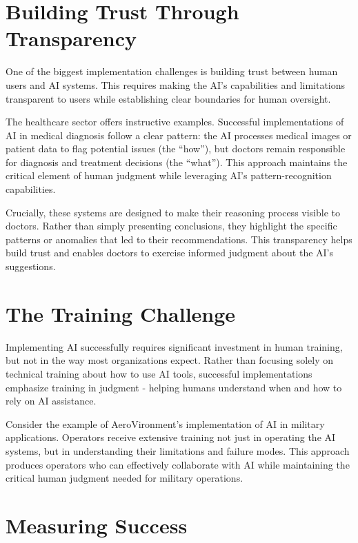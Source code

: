 \documentclass[
  Letterpaper,
]{scrbook}
\begin{document}
\section{Building Trust Through
Transparency}\label{building-trust-through-transparency}

One of the biggest implementation challenges is building trust between
human users and AI systems. This requires making the AI's capabilities
and limitations transparent to users while establishing clear boundaries
for human oversight.

The healthcare sector offers instructive examples. Successful
implementations of AI in medical diagnosis follow a clear pattern: the
AI processes medical images or patient data to flag potential issues
(the ``how''), but doctors remain responsible for diagnosis and
treatment decisions (the ``what''). This approach maintains the critical
element of human judgment while leveraging AI's pattern-recognition
capabilities.

Crucially, these systems are designed to make their reasoning process
visible to doctors. Rather than simply presenting conclusions, they
highlight the specific patterns or anomalies that led to their
recommendations. This transparency helps build trust and enables doctors
to exercise informed judgment about the AI's suggestions.

\section{The Training Challenge}\label{the-training-challenge}

Implementing AI successfully requires significant investment in human
training, but not in the way most organizations expect. Rather than
focusing solely on technical training about how to use AI tools,
successful implementations emphasize training in judgment - helping
humans understand when and how to rely on AI assistance.

Consider the example of AeroVironment's implementation of AI in military
applications. Operators receive extensive training not just in operating
the AI systems, but in understanding their limitations and failure
modes. This approach produces operators who can effectively collaborate
with AI while maintaining the critical human judgment needed for
military operations.

\section{Measuring Success}\label{measuring-success}
\end{document}
